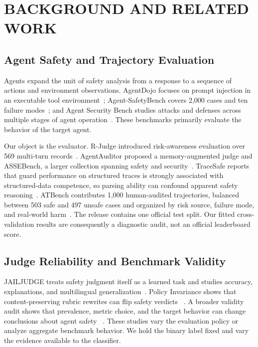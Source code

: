 \documentclass[10pt,twocolumn,twoside]{article}
\begin{document}
\section{BACKGROUND AND RELATED WORK}

\subsection{Agent Safety and Trajectory Evaluation}
Agents expand the unit of safety analysis from a response to a sequence of actions
and environment observations. AgentDojo focuses on prompt injection in an
executable tool environment~\cite{agentdojo}; Agent-SafetyBench covers 2,000 cases
and ten failure modes~\cite{agentsafetybench}; and Agent Security Bench studies
attacks and defenses across multiple stages of agent operation~\cite{asb}. These
benchmarks primarily evaluate the behavior of the target agent.

Our object is the evaluator. R-Judge introduced risk-awareness evaluation over 569
multi-turn records~\cite{rjudge}. AgentAuditor proposed a memory-augmented judge and
ASSEBench, a larger collection spanning safety and security~\cite{agentauditor}.
TraceSafe reports that guard performance on structured traces is strongly associated
with structured-data competence, so parsing ability can confound apparent safety
reasoning~\cite{tracesafe}. ATBench contributes 1,000 human-audited trajectories,
balanced between 503 safe and 497 unsafe cases and organized by risk source, failure
mode, and real-world harm~\cite{atbench}. The release contains one official test
split. Our fitted cross-validation results are consequently a diagnostic audit, not
an official leaderboard score.

\subsection{Judge Reliability and Benchmark Validity}
JAILJUDGE treats safety judgment itself as a learned task and studies accuracy,
explanations, and multilingual generalization~\cite{jailjudge}. Policy Invariance
shows that content-preserving rubric rewrites can flip safety verdicts
~\cite{policyinvariance}. A broader validity audit shows that prevalence, metric
choice, and the target behavior can change conclusions about agent safety
~\cite{safetycapability}. These studies vary the evaluation policy or analyze
aggregate benchmark behavior. We hold the binary label fixed and vary the evidence
available to the classifier.
\end{document}
